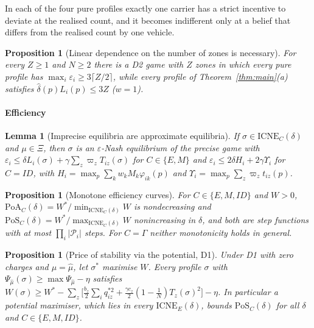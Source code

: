 \documentclass[preprint,11pt]{elsarticle}
\newtheorem{lemma}[theorem]{Lemma}
\newtheorem{proposition}[theorem]{Proposition}
\theoremstyle{definition}
\theoremstyle{remark}
\newcommand{\cP}{\mathcal{P}}
\newcommand{\ICNE}{\mathrm{ICNE}}
\begin{document}
In each of the four pure profiles exactly one carrier has a strict incentive to deviate at the realised count, and it becomes indifferent only at a belief that differs from the realised count by one vehicle.

\begin{proposition}[Linear dependence on the number of zones is necessary]\label{prop:cycles}
For every $Z\ge1$ and $N\ge2$ there is a D2 game with $Z$ zones in which every pure profile has $\max_i\varepsilon_i\ge3\lceil Z/2\rceil$, while every profile of Theorem~\ref{thm:main}(a) satisfies $\hat\delta(p)L_i(p)\le3Z$ ($w=1$).
\end{proposition}

\paragraph{Efficiency}

\begin{lemma}[Imprecise equilibria are approximate equilibria]\label{lem:transfer}
If $\sigma\in\ICNE_C(\delta)$ and $\mu\in\Xi$, then $\sigma$ is an $\varepsilon$-Nash equilibrium of the precise game with $\varepsilon_i\le\delta L_i(\sigma)+\gamma\sum_z\varpi_zT_{iz}(\sigma)$ for $C\in\{E,M\}$ and $\varepsilon_i\le2\delta H_i+2\gamma\Upsilon_i$ for $C=ID$, with $H_i=\max_p\sum_kw_kM_k\varphi_{ik}(p)$ and $\Upsilon_i=\max_p\sum_z\varpi_zt_{iz}(p)$.
\end{lemma}

\begin{proposition}[Monotone efficiency curves]\label{prop:cs}
For $C\in\{E,M,ID\}$ and $W>0$, $\mathrm{PoA}_C(\delta)=W^*/\min_{\ICNE_C(\delta)}W$ is nondecreasing and $\mathrm{PoS}_C(\delta)=W^*/\max_{\ICNE_C(\delta)}W$ nonincreasing in $\delta$, and both are step functions with at most $\prod_i|\cP_i|$ steps. For $C=\Gamma$ neither monotonicity holds in general.
\end{proposition}

\begin{proposition}[Price of stability via the potential, D1]\label{prop:pos}
Under D1 with zero charges and $\mu=\hat\mu$, let $\sigma^*$ maximise $W$. Every profile $\sigma$ with $\Psi_{\hat\mu}(\sigma)\ge\max\Psi_{\hat\mu}-\eta$ satisfies
$W(\sigma)\ge W^*-\sum_z\big[\tfrac{b_z}{2}\sum_iq_{iz}^{*2}+\tfrac{\gamma c_z}{2}(1-\tfrac1N)T_z(\sigma)^2\big]-\eta$. In particular a potential maximiser, which lies in every $\ICNE_E(\delta)$, bounds $\mathrm{PoS}_C(\delta)$ for all $\delta$ and $C\in\{E,M,ID\}$.
\end{proposition}
\end{document}
